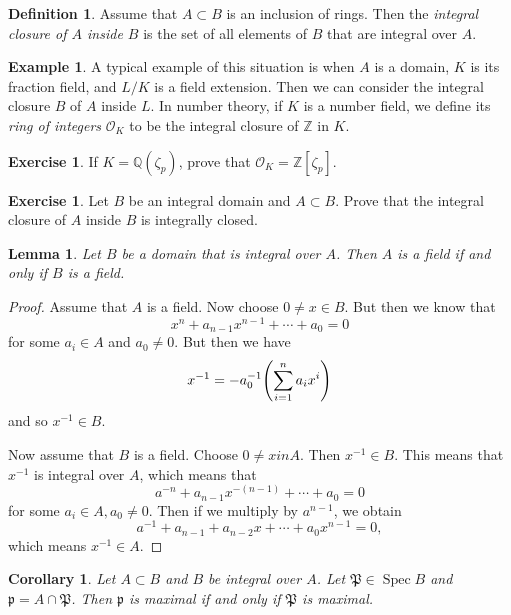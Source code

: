 \documentclass[leqno, openany]{memoir}
\newtheorem{cor}[thm]{Corollary}
\newtheorem{lem}[thm]{Lemma}
\theoremstyle{definition}
\newtheorem{defn}[thm]{Definition}
\newtheorem{exm}[thm]{Example}
\newtheorem{exer}[thm]{Exercise}
\theoremstyle{remark}
\theoremstyle{plain}
\theoremstyle{definition}
\theoremstyle{remark}
\newcommand{\Z}{\mathbb{Z}}
\newcommand{\Q}{\mathbb{Q}}
\newcommand{\mc}[1]{\mathcal{#1}}
\newcommand{\mf}[1]{\mathfrak{#1}}
\DeclareMathOperator{\Spec}{Spec}
\begin{document}
\begin{defn}
    Assume that $A \subset B$ is an inclusion of rings. Then the \textit{integral closure of $A$ inside $B$} is the set of all elements of $B$ that are integral over $A$. 
\end{defn}

\begin{exm}
    A typical example of this situation is when $A$ is a domain, $K$ is its fraction field, and $L / K$ is a field extension. Then we can consider the integral closure $B$ of $A$ inside $L$. In number theory, if $K$ is a number field, we define its \textit{ring of integers} $\mc{O}_K$ to be the integral closure of $\Z$ in $K$.
\end{exm}

\begin{exer}
    If $K = \Q(\zeta_p)$, prove that $\mc{O}_K = \Z[\zeta_p]$.
\end{exer}

\begin{exer}
    Let $B$ be an integral domain and $A \subset B$. Prove that the integral closure of $A$ inside $B$ is integrally closed.
\end{exer}

\begin{lem}
    Let $B$ be a domain that is integral over $A$. Then $A$ is a field if and only if $B$ is a field.
\end{lem}

\begin{proof}
    Assume that $A$ is a field. Now choose $0 \neq x \in B$. But then we know that 
    \[ x^n + a_{n-1}x^{n-1} + \cdots + a_0 = 0 \]
    for some $a_i \in A$ and $a_0 \neq 0$. But then we have
    \[ x^{-1} = -a_0^{-1} \qty( \sum_{i=1}^n a_i x^i ) \]
    and so $x^{-1} \in B$.

    Now assume that $B$ is a field. Choose $0 \neq x in A$. Then $x^{-1} \in B$. This means that $x^{-1}$ is integral over $A$, which means that
    \[ a^{-n} + a_{n-1} x^{-(n-1)} + \cdots + a_0 = 0 \]
    for some $a_i \in A, a_0 \neq 0$. Then if we multiply by $a^{n-1}$, we obtain
    \[ a^{-1} + a_{n-1} + a_{n-2} x + \cdots + a_0 x^{n-1} = 0, \]
    which means $x^{-1} \in A$.
\end{proof}

\begin{cor}
    Let $A \subset B$ and $B$ be integral over $A$. Let $\mf{P} \in \Spec B$ and $\mf{p} = A \cap \mf{P}$. Then $\mf{p}$ is maximal if and only if $\mf{P}$ is maximal.
\end{cor}
\end{document}
